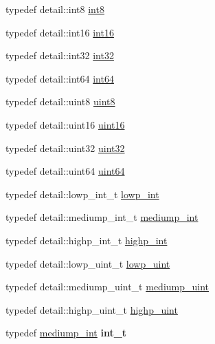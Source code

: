 \begin{DoxyCompactItemize}
\item 
typedef detail\-::int8 \hyperlink{group__gtc__type__precision_ga96254f9c1c4506fc8eb5cf3301ce8565}{int8}
\item 
typedef detail\-::int16 \hyperlink{group__gtc__type__precision_ga2945a61d12771f8954994fcddf02b021}{int16}
\item 
typedef detail\-::int32 \hyperlink{group__gtc__type__precision_ga632d8b25f6b61659f39ea4321fab92a4}{int32}
\item 
typedef detail\-::int64 \hyperlink{group__gtc__type__precision_ga435d75819cce297cc5fa21bd84ef89a5}{int64}
\item 
typedef detail\-::uint8 \hyperlink{group__gtc__type__precision_ga1a7dcd8aac97cc8020817c94049deff2}{uint8}
\item 
typedef detail\-::uint16 \hyperlink{group__gtc__type__precision_gad8c2939e1fdd8e5828b31d95c52255d5}{uint16}
\item 
typedef detail\-::uint32 \hyperlink{group__gtc__type__precision_ga202b6a53c105fcb7e531f9b443518451}{uint32}
\item 
typedef detail\-::uint64 \hyperlink{group__gtc__type__precision_gae3632bf9b37da66233d78930dd06378a}{uint64}
\item 
typedef detail\-::lowp\-\_\-int\-\_\-t \hyperlink{group__core__precision_ga4681244bf4a184734f03aa9df4e3d288}{lowp\-\_\-int}
\item 
typedef detail\-::mediump\-\_\-int\-\_\-t \hyperlink{group__core__precision_ga2a3dcbcd7f4e17663d393a12061ac6ac}{mediump\-\_\-int}
\item 
typedef detail\-::highp\-\_\-int\-\_\-t \hyperlink{group__core__precision_gaafed5240eb0a43328cb75faf5fb0a8c2}{highp\-\_\-int}
\item 
typedef detail\-::lowp\-\_\-uint\-\_\-t \hyperlink{group__core__precision_ga8077c90f2c87e419ea6c273157dcc1fc}{lowp\-\_\-uint}
\item 
typedef detail\-::mediump\-\_\-uint\-\_\-t \hyperlink{group__core__precision_ga08ae38ad78ade3539fdd1d25052b8c51}{mediump\-\_\-uint}
\item 
typedef detail\-::highp\-\_\-uint\-\_\-t \hyperlink{group__core__precision_gabfd1cf11193324a5f77d3831b6ac3205}{highp\-\_\-uint}
\item 
\hypertarget{group__core__precision_gacd01d170508f812968875b0f2e730e8c}{typedef \hyperlink{group__core__precision_ga2a3dcbcd7f4e17663d393a12061ac6ac}{mediump\-\_\-int} {\bfseries int\-\_\-t}}\label{group__core__precision_gacd01d170508f812968875b0f2e730e8c}


\end{DoxyCompactItemize}
